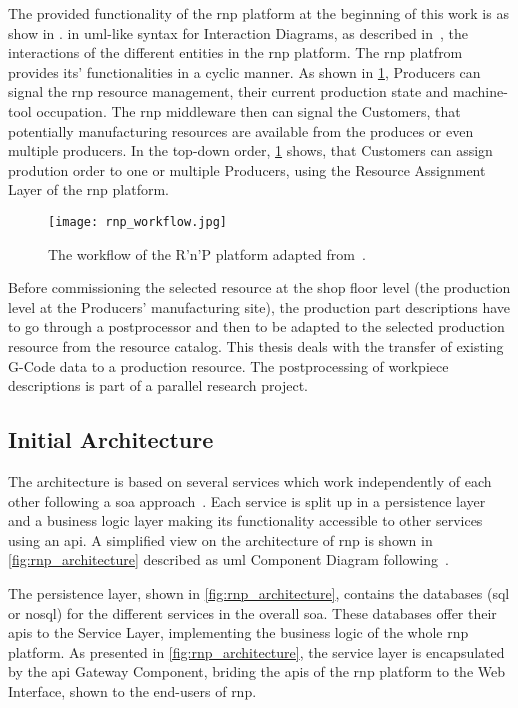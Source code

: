 \documentclass[
a4paper,
twoside,
headsepline,
cleardoublepage=empty,
parskip=half,
draft=false
]{scrbook}
\begin{document}
			The provided functionality of the \gls{rnp} platform at the beginning of this work is as show in .  in \gls{uml}-like syntax for Interaction Diagrams, as described in~\cite{uml2017}, the interactions of the different entities in the \gls{rnp} platform. The \gls{rnp} platfrom provides its' functionalities in a cyclic manner. As shown in \cref{fig:rnp_workflow}, Producers can signal the \gls{rnp} resource management, their current production state and machine-tool occupation. The \gls{rnp} middleware then can signal the Customers, that potentially manufacturing resources are available from the produces or even multiple producers. In the top-down order, \cref{fig:rnp_workflow} shows, that Customers can assign prodution order to one or multiple Producers, using the Resource Assignment Layer of the \gls{rnp} platform.

			\begin{figure}[htbp]
				\centering
				\texttt{[image: rnp\_workflow.jpg]}
				\caption{The workflow of the R'n'P platform adapted from~\cite{ellwein2016}.}
				\label{fig:rnp_workflow}
			\end{figure}

			Before commissioning the selected resource at the shop floor level (the production level at the Producers' manufacturing site), the production part descriptions have to go through a postprocessor and then to be adapted to the selected production resource from the resource catalog.
			This thesis deals with the transfer of existing G-Code data to a production resource.
			The postprocessing of workpiece descriptions is part of a parallel research project.

			\subsection{Initial Architecture}\label{subsec:initial_architecture}

			The architecture is based on several services which work independently of each other following a \gls{soa} approach~\cite{erl2008soa}.
			Each service is split up in a persistence layer and a business logic layer making its functionality accessible to other services using an \gls{api}.
			A simplified view on the architecture of \gls{rnp} is shown in \cref{fig:rnp_architecture} described as \gls{uml} Component Diagram following~\cite{uml2017}.
			
			The persistence layer, shown in \cref{fig:rnp_architecture}, contains the databases (\gls{sql} or \gls{nosql}) for the different services in the overall \gls{soa}. These databases offer their \gls{api}s to the Service Layer, implementing the business logic of the whole \gls{rnp} platform. As presented in \cref{fig:rnp_architecture}, the service layer is encapsulated by the \gls{api} Gateway Component, briding the \gls{api}s of the \gls{rnp} platform to the Web Interface, shown to the end-users of \gls{rnp}.
\end{document}
